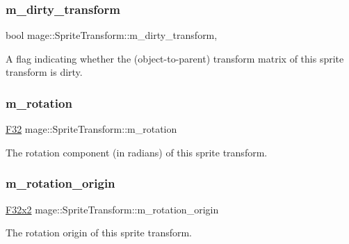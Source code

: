 \subsubsection{\texorpdfstring{m\+\_\+dirty\+\_\+transform}{m\_dirty\_transform}}
{\footnotesize\ttfamily bool mage\+::\+Sprite\+Transform\+::m\+\_\+dirty\+\_\+transform\hspace{0.3cm}{\ttfamily [mutable]}, {\ttfamily [private]}}

A flag indicating whether the (object-\/to-\/parent) transform matrix of this sprite transform is dirty. \hypertarget{classmage_1_1_sprite_transform_a7c705543e7f6a9c7e7a517ffef2cb4b9}{}\label{classmage_1_1_sprite_transform_a7c705543e7f6a9c7e7a517ffef2cb4b9} 
\subsubsection{\texorpdfstring{m\+\_\+rotation}{m\_rotation}}
{\footnotesize\ttfamily \hyperlink{namespacemage_aa97e833b45f06d60a0a9c4fc22ae02c0}{F32} mage\+::\+Sprite\+Transform\+::m\+\_\+rotation\hspace{0.3cm}{\ttfamily [private]}}

The rotation component (in radians) of this sprite transform. \hypertarget{classmage_1_1_sprite_transform_aa6a3a2653a00fb17116ce81979214e27}{}\label{classmage_1_1_sprite_transform_aa6a3a2653a00fb17116ce81979214e27} 
\subsubsection{\texorpdfstring{m\+\_\+rotation\+\_\+origin}{m\_rotation\_origin}}
{\footnotesize\ttfamily \hyperlink{namespacemage_aa87237ad091f5cd7da612b8523fc108f}{F32x2} mage\+::\+Sprite\+Transform\+::m\+\_\+rotation\+\_\+origin\hspace{0.3cm}{\ttfamily [private]}}

The rotation origin of this sprite transform. \hypertarget{classmage_1_1_sprite_transform_a2995048f52d8d90d003ea421d58772be}{}\label{classmage_1_1_sprite_transform_a2995048f52d8d90d003ea421d58772be} 
